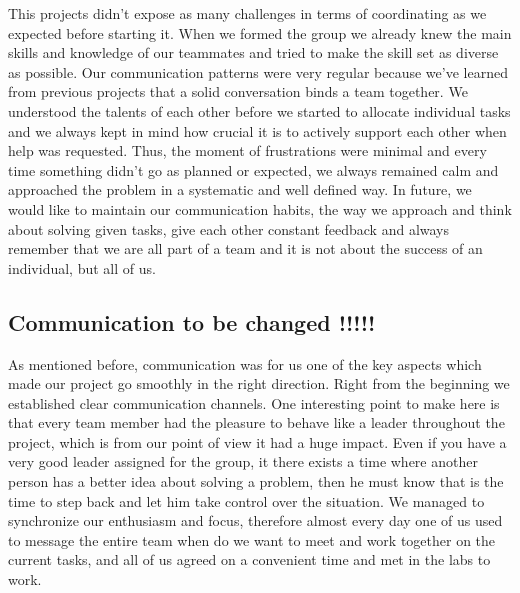 \documentclass[11pt]{article}
\begin{document}
This projects didn't expose as many challenges in terms of coordinating as we expected before starting it. When we formed the group we already knew the main skills and knowledge of our teammates and tried to make the skill set as diverse as possible. Our communication patterns were very regular because we've learned from previous projects that a solid conversation binds a team together. We understood the talents of each other before we started to allocate individual tasks  and we always kept in mind how crucial it is to actively support each other when help was requested. Thus, the moment of frustrations were minimal and every time something didn't go as planned or expected, we always remained calm and approached the problem in a systematic and well defined way. In future, we would like to maintain our communication habits, the way we approach and think about solving given tasks, give each other constant feedback and always remember that we are all part of a team and it is not about the success of an individual, but all of us.

\subsection{Communication to be changed !!!!!}
As mentioned before, communication was for us one of the key aspects which made our project go smoothly in the right direction. Right from the beginning we established clear communication channels. One interesting point to make here is that every team member had the pleasure to behave like a leader throughout the project, which is from our point of view it had a huge impact. Even if you have a very good leader assigned for the group, it there exists a time where another person has a better idea about solving a problem, then he must know that is the time to step back and let him take control over the situation. We managed to synchronize our enthusiasm and focus, therefore almost every day one of us used to message the entire team when do we want to meet and work together on the current tasks, and all of us agreed on a convenient time and met in the labs to work.
\end{document}
